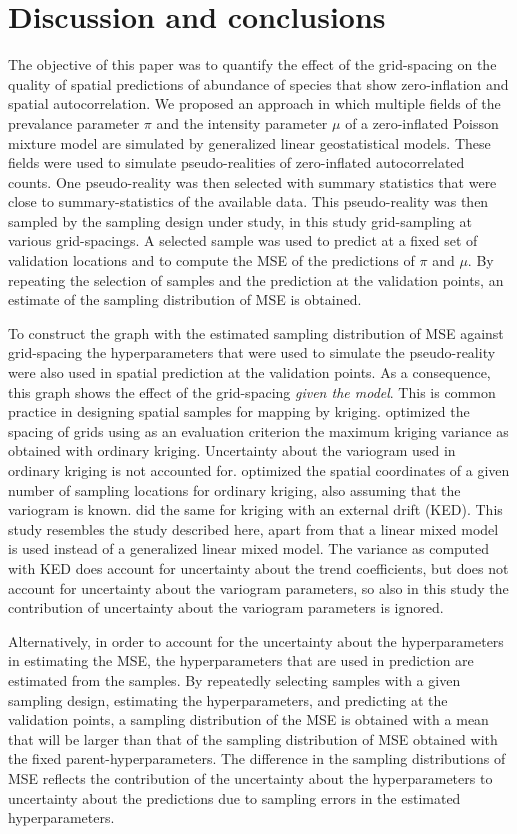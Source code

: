 \documentclass[review]{elsarticle}
\begin{document}
\section{Discussion and conclusions}\label{sec:discussion}
The objective of this paper was to quantify the effect of the grid-spacing on the quality of spatial predictions of abundance of species that show zero-inflation and spatial autocorrelation. We proposed an approach in which multiple fields of the prevalance parameter $\pi$ and the intensity parameter $\mu$ of a zero-inflated Poisson mixture model are simulated by generalized linear geostatistical models. These fields were used to simulate pseudo-realities of zero-inflated autocorrelated counts. One pseudo-reality was then selected with summary statistics that were close to summary-statistics of the available data. This pseudo-reality was then sampled by the sampling design under study, in this study grid-sampling at various grid-spacings. A selected sample was used to predict at a fixed set of validation locations and to compute the MSE of the predictions of $\pi$ and $\mu$. By repeating the selection of samples and the prediction at the validation points, an estimate of the sampling distribution of MSE is obtained.

To construct the graph with the estimated sampling distribution of MSE against grid-spacing the hyperparameters that were used to simulate the pseudo-reality were also used in spatial prediction at the validation points. As a consequence, this graph shows the effect of the grid-spacing \emph{given the model}. This is common practice in designing spatial samples for mapping by kriging. \citet{mcbratney1981} optimized  the spacing of grids using as an evaluation criterion the maximum kriging variance as obtained with ordinary kriging. Uncertainty about the variogram used in ordinary kriging is not accounted for. 
\citet{vangroenigen1999} optimized the spatial coordinates of a given number of sampling locations for ordinary kriging, also assuming that the variogram is known. \citet{brus2007} did the same for kriging with an external drift (KED). This study resembles the study described here, apart from that a linear mixed model is used instead of a generalized linear mixed model. The variance as computed with KED does account for uncertainty about the trend coefficients, but does not account for uncertainty about the variogram parameters, so also in this study the contribution of uncertainty about the variogram parameters is ignored.

Alternatively, in order to account for the uncertainty about the hyperparameters in estimating the MSE, the hyperparameters that are used in prediction are estimated from the samples. By repeatedly selecting samples with a given sampling design, estimating the hyperparameters, and predicting at the validation points, a sampling distribution of the MSE is obtained with a mean that will be larger than that of the sampling distribution of MSE obtained with the fixed parent-hyperparameters. The difference in the sampling distributions of MSE reflects the contribution of the uncertainty about the hyperparameters to uncertainty about the predictions due to sampling errors in the estimated hyperparameters.
\end{document}
